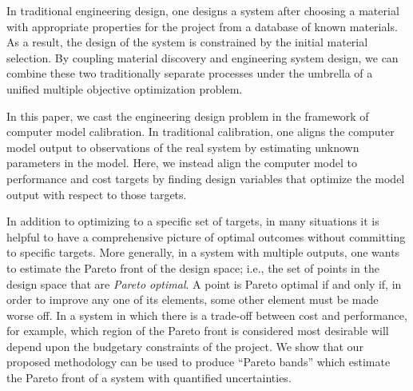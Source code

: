 \documentclass[12pt]{article}
\begin{document}
In traditional engineering design, one designs a system after choosing a material with appropriate properties for the project from a database of known materials. 
%
%
As a result, the design of the system is constrained by the initial material selection.
%
By coupling material discovery and engineering system design, we can combine these two traditionally separate processes under the umbrella of a unified multiple objective optimization problem.


In this paper, we cast the engineering design problem in the framework of computer model calibration.
%
In traditional calibration, one aligns the computer model output to observations of the real system by estimating unknown parameters in the model.
%
Here, we instead align the computer model to performance and cost targets by finding design variables that optimize the model output with respect to those targets.
%

%
In addition to optimizing to a specific set of targets, in many situations it is helpful to have a comprehensive picture of optimal outcomes without committing to specific targets.
%
More generally, in a system with multiple outputs, one wants to estimate the Pareto front of the design space; i.e., the set of points in the design space that are {\em Pareto optimal}.
%
A point is Pareto optimal if and only if, in order to improve any one of its elements, some other element must be made worse off.
%
%
In a system in which there is a trade-off between cost and performance, for example, which region of the Pareto front is considered most desirable will depend upon the budgetary constraints of the project.
%
%
We show that our proposed methodology can be used to produce ``Pareto bands'' which estimate the Pareto front of a system with quantified uncertainties. 
%
\end{document}
